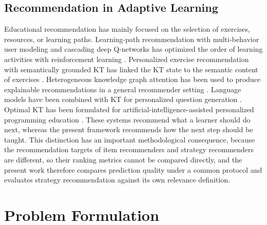 \documentclass[11pt]{article}
\begin{document}
\subsection{Recommendation in Adaptive Learning}

Educational recommendation has mainly focused on the selection of exercises, resources, or learning paths. Learning-path recommendation with multi-behavior user modeling and cascading deep Q-networks has optimized the order of learning activities with reinforcement learning \cite{ma2024learning}. Personalized exercise recommendation with semantically grounded KT has linked the KT state to the semantic content of exercises \cite{ozyurt2025personalized}. Heterogeneous knowledge graph attention has been used to produce explainable recommendations in a general recommender setting \cite{zhang2025hkgat}. Language models have been combined with KT for personalized question generation \cite{yin2025leveraging}. Optimal KT has been formulated for artificial-intelligence-assisted personalized programming education \cite{wang2026futureproofing}. These systems recommend what a learner should do next, whereas the present framework recommends how the next step should be taught. This distinction has an important methodological consequence, because the recommendation targets of item recommenders and strategy recommenders are different, so their ranking metrics cannot be compared directly, and the present work therefore compares prediction quality under a common protocol and evaluates strategy recommendation against its own relevance definition.

\section{Problem Formulation}\label{sec:problem}
\end{document}
